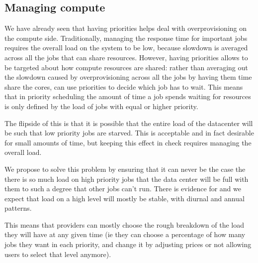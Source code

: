 


\subsection{Managing compute}

We have already seen that having priorities helps \sys{} deal with
overprovisioning on the compute side. Traditionally, managing the response time
for important jobs requires the overall load on the system to be low, because
slowdown is averaged across all the jobs that can share resources. However,
having priorities allows \sys{} to be targeted about how compute resources are
shared: rather than averaging out the slowdown caused by overprovisioning across
all the jobs by having them time share the cores, \sys{} can use priorities to
decide which job has to wait. This means that in priority scheduling the amount
of time a job spends waiting for resources is only defined by the load of jobs
with equal or higher priority.

The flipside of this is that it is possible that the entire load of the
datacenter will be such that low priority jobs are starved. This is acceptable
and in fact desirable for small amounts of time, but keeping this effect in
check requires managing the overall load. 

We propose to solve this problem by ensuring that it can never be the case the
there is so much load on high priority jobs that the data center will be full
with them to such a degree that other jobs can't run. There is evidence for and
we expect that load on a high level will mostly be stable, with diurnal and
annual patterns.\cite{TODO}

This means that providers can mostly choose the rough breakdown of the load they
will have at any given time (ie they can choose a percentage of how many jobs
they want in each priority, and change it by adjusting prices or not allowing
users to select that level anymore). 


